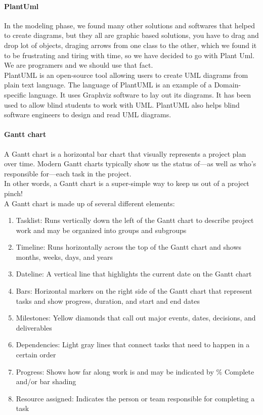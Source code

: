 \paragraph*{PlantUml}
In the modeling phase, we found many other solutions and softwares that helped to create diagrams, but they all are graphic based solutions, you have to drag and drop lot of objects, draging arrows from one class to the other, which we found it to be frustrating and tiring with time, so we have decided to go with Plant Uml. We are programers and we should use that fact.\\
PlantUML is an open-source tool allowing users to create UML diagrams from plain text language. The language of PlantUML is an example of a Domain-specific language. It uses Graphviz software to lay out its diagrams. It has been used to allow blind students to work with UML. PlantUML also helps blind software engineers to design and read UML diagrams.


\paragraph*{Gantt chart}
A Gantt chart is a horizontal bar chart that visually represents a project plan over time. Modern Gantt charts typically show us the status of—as well as who’s responsible for—each task in the project.\\

In other words, a Gantt chart is a super-simple way to keep us out of a project pinch!\\

A Gantt chart is made up of several different elements:
\begin{enumerate}
      \item
            Tasklist: Runs vertically down the left of the Gantt chart to describe project work and may be organized into groups and subgroups
      \item
            Timeline: Runs horizontally across the top of the Gantt chart and shows months, weeks, days, and years
      \item
            Dateline: A vertical line that highlights the current date on the Gantt chart
      \item
            Bars: Horizontal markers on the right side of the Gantt chart that represent tasks and show progress, duration, and start and end dates
      \item
            Milestones: Yellow diamonds that call out major events, dates, decisions, and deliverables
      \item
            Dependencies: Light gray lines that connect tasks that need to happen in a certain order
      \item
            Progress: Shows how far along work is and may be indicated by \% Complete and/or bar shading
      \item
            Resource assigned: Indicates the person or team responsible for completing a task
\end{enumerate}


